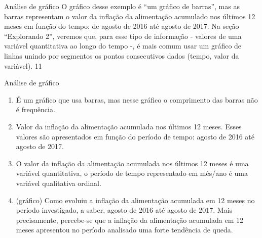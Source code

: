 {\begin{sugestions}{Análise de gráfico}
{
O gráfico desse exemplo é “um gráfico de barras”, mas as barras representam o valor da inflação da alimentação acumulado nos últimos 12 meses em função do tempo: de agosto de 2016 até agosto de 2017. Na seção “Explorando 2”, veremos que, para esse tipo de informação - valores de uma variável quantitativa ao longo do tempo -, é mais comum usar um gráfico de linhas unindo por segmentos os pontos consecutivos dados (tempo, valor da variável).
}{1}{1}
\end{sugestions}
\begin{answer}{Análise de gráfico}
{
\begin{enumerate}
\item É um gráfico que usa barras, mas nesse gráfico o comprimento das barras não é frequência.

\item Valor da inflação da alimentação acumulada nos últimos 12 meses. Esses valores são apresentados em função do período de tempo: agosto de 2016 até agosto de 2017.

\item O valor da inflação da alimentação acumulada nos últimos 12 meses é uma variável quantitativa, o período de tempo representado em mês/ano é uma variável qualitativa ordinal.

\item (gráfico) Como evoluiu a inflação da alimentação acumulada em 12 meses no período investigado, a saber, agosto de 2016 até agosto de 2017. Mais precisamente, percebe-se que a inflação da alimentação acumulada em 12 meses apresentou no período analisado uma forte tendência de queda.

\begin{figure}[H]
\centering


\end{figure}
\end{enumerate}}
\end{answer}}
